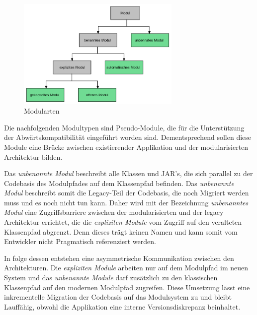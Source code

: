     \begin{figure}[h]
      \centering
      \includegraphics[width=0.7\textwidth]{material/images/module-tree.png}
      \caption{Modularten}
      \label{fig:kopplung}
    \end{figure}

    Die nachfolgenden Modultypen sind Pseudo-Module, die für die Unterstützung der Abwärtskompatibilität eingeführt worden sind. 
    Dementsprechend sollen diese Module eine Brücke zwischen existierender Applikation und der modularisierten Architektur bilden.

    Das \textit{unbenannte Modul} beschreibt alle Klassen und JAR's, die sich parallel zu der Codebasis des Modulpfades auf dem Klassenpfad befinden. Das \textit{unbenannte Modul} beschreibt somit die Legacy-Teil der Codebasis, die noch Migriert werden muss und es noch nicht tun kann. Daher wird mit der Bezeichnung \textit{unbenanntes Modul} eine Zugriffsbarriere zwischen der modularisierten und der legacy Architektur errichtet, die die \textit{expliziten Module} vom Zugriff auf den veralteten Klassenpfad abgrenzt. Denn dieses trägt keinen Namen und kann somit vom Entwickler nicht Pragmatisch referenziert werden.

    In folge dessen entstehen eine asymmetrische Kommunikation zwischen den Architekturen. Die \textit{expliziten Module} arbeiten nur auf dem Modulpfad im neuen System und das \textit{unbenannte Module} darf zusätzlich zu den klassischen Klassenpfad auf den modernen Modulpfad zugreifen. Diese Umsetzung lässt eine inkrementelle Migration der Codebasis auf das Modulsystem zu und bleibt Lauffähig, obwohl die Applikation eine interne Versionsdiskrepanz beinhaltet.

